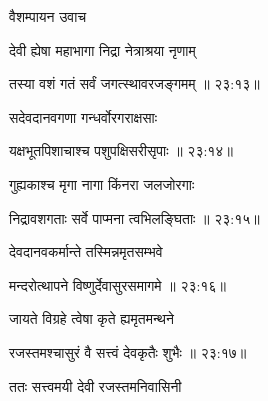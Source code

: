 {\devanagarifont वैशम्पायन उवाच {\dandab}\dontdisplaylinenum  }%
 
{\devanagarifont देवी ह्येषा महाभागा निद्रा नेत्राश्रया नृणाम् \thinspace{\danda} \dontdisplaylinenum }%


{\devanagarifont तस्या वशं गतं सर्वं जगत्स्थावरजङ्गमम् {॥ २३:१३॥} \veg\dontdisplaylinenum }%
 
{\devanagarifont सदेवदानवगणा गन्धर्वोरगराक्षसाः \thinspace{\dandab} \dontdisplaylinenum }%


{\devanagarifont यक्षभूतपिशाचाश्च पशुपक्षिसरीसृपाः {॥ २३:१४॥} \veg\dontdisplaylinenum }%

{\devanagarifont गुह्यकाश्च मृगा नागा किंनरा जलजोरगाः \thinspace{\dandab} \dontdisplaylinenum }%


{\devanagarifont निद्रावशगताः सर्वे पाप्मना त्वभिलङ्घिताः {॥ २३:१५॥} \veg\dontdisplaylinenum }%
 
{\devanagarifont देवदानवकर्मान्ते तस्मिन्नमृतसम्भवे \thinspace{\dandab} \dontdisplaylinenum }%


{\devanagarifont मन्दरोत्थापने विष्णुर्देवासुरसमागमे {॥ २३:१६॥} \veg\dontdisplaylinenum }%

{\devanagarifont जायते विग्रहे त्वेषा कृते ह्यमृतमन्थने \thinspace{\dandab} \dontdisplaylinenum }%
 

{\devanagarifont रजस्तमश्चासुरं वै सत्त्वं देवकृतैः शुभैः {॥ २३:१७॥} \veg\dontdisplaylinenum }%
 
{\devanagarifont ततः सत्त्वमयी देवी रजस्तमनिवासिनी \thinspace{\dandab} \dontdisplaylinenum }%

